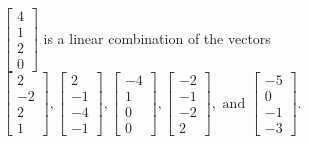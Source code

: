 \begin{exercise}
\begin{exerciseStatement}
  \end{exerciseStatement}
  \begin{exerciseAnswer}
   \(\left[\begin{array}{c}
4 \\
1 \\
2 \\
0
\end{array}\right]\) 
  	 is  
	a linear combination of the vectors \(\left[\begin{array}{c}
2 \\
-2 \\
2 \\
1
\end{array}\right] , \left[\begin{array}{c}
2 \\
-1 \\
-4 \\
-1
\end{array}\right] , \left[\begin{array}{c}
-4 \\
1 \\
0 \\
0
\end{array}\right] , \left[\begin{array}{c}
-2 \\
-1 \\
-2 \\
2
\end{array}\right] , \text{ and } \left[\begin{array}{c}
-5 \\
0 \\
-1 \\
-3
\end{array}\right]\).

	
  


  \end{exerciseAnswer}
\end{exercise}